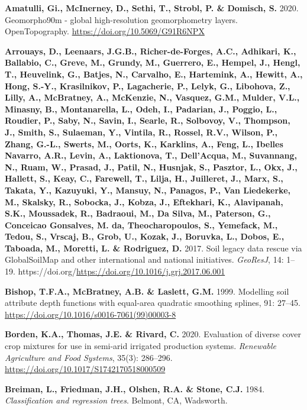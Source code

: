\documentclass[
  10pt,
  b5paper,
  oneside]{book}
\newlength{\cslhangindent}
\newenvironment{CSLReferences}[2] %
 {\begin{list}{}{%
  \setlength{\itemindent}{0pt}
  \setlength{\leftmargin}{0pt}
  \setlength{\parsep}{0pt}
  \ifodd #1
   \setlength{\leftmargin}{\cslhangindent}
   \setlength{\itemindent}{-1\cslhangindent}
  \fi
  \setlength{\itemsep}{#2\baselineskip}}}
 {\end{list}}
\begin{document}
\label{refs}
\begin{CSLReferences}{0}{0}
\textbf{Amatulli, Gi., McInerney, D., Sethi, T., Strobl, P. \& Domisch, S.} 2020. Geomorpho90m - global high-resolution geomorphometry layers. OpenTopography. \url{https://doi.org/10.5069/G91R6NPX}

\textbf{Arrouays, D., Leenaars, J.G.B., Richer-de-Forges, A.C., Adhikari, K., Ballabio, C., Greve, M., Grundy, M., Guerrero, E., Hempel, J., Hengl, T., Heuvelink, G., Batjes, N., Carvalho, E., Hartemink, A., Hewitt, A., Hong, S.-Y., Krasilnikov, P., Lagacherie, P., Lelyk, G., Libohova, Z., Lilly, A., McBratney, A., McKenzie, N., Vasquez, G.M., Mulder, V.L., Minasny, B., Montanarella, L., Odeh, I., Padarian, J., Poggio, L., Roudier, P., Saby, N., Savin, I., Searle, R., Solbovoy, V., Thompson, J., Smith, S., Sulaeman, Y., Vintila, R., Rossel, R.V., Wilson, P., Zhang, G.-L., Swerts, M., Oorts, K., Karklins, A., Feng, L., Ibelles Navarro, A.R., Levin, A., Laktionova, T., Dell'Acqua, M., Suvannang, N., Ruam, W., Prasad, J., Patil, N., Husnjak, S., Pasztor, L., Okx, J., Hallett, S., Keay, C., Farewell, T., Lilja, H., Juilleret, J., Marx, S., Takata, Y., Kazuyuki, Y., Mansuy, N., Panagos, P., Van Liedekerke, M., Skalsky, R., Sobocka, J., Kobza, J., Eftekhari, K., Alavipanah, S.K., Moussadek, R., Badraoui, M., Da Silva, M., Paterson, G., Conceicao Gonsalves, M. da, Theocharopoulos, S., Yemefack, M., Tedou, S., Vrscaj, B., Grob, U., Kozak, J., Boruvka, L., Dobos, E., Taboada, M., Moretti, L. \& Rodriguez, D.} 2017. Soil legacy data rescue via GlobalSoilMap and other international and national initiatives. \emph{GeoResJ}, 14: 1--19. https://doi.org/\url{https://doi.org/10.1016/j.grj.2017.06.001}

\textbf{Bishop, T.F.A., McBratney, A.B. \& Laslett, G.M.} 1999. Modelling soil attribute depth functions with equal-area quadratic smoothing splines, 91: 27--45. \url{https://doi.org/10.1016/s0016-7061(99)00003-8}

\textbf{Borden, K.A., Thomas, J.E. \& Rivard, C.} 2020. Evaluation of diverse cover crop mixtures for use in semi-arid irrigated production systems. \emph{Renewable Agriculture and Food Systems}, 35(3): 286--296. \url{https://doi.org/10.1017/S1742170518000509}

\textbf{Breiman, L., Friedman, J.H., Olshen, R.A. \& Stone, C.J.} 1984. \emph{Classification and regression trees}. Belmont, CA, Wadsworth.


\end{CSLReferences}
\end{document}
